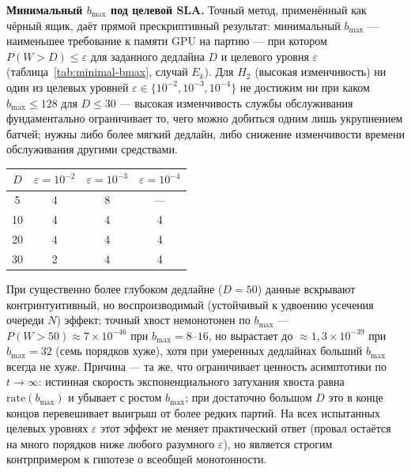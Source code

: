 \documentclass[12pt,a4paper]{article}
\begin{document}
\bigskip
\noindent\textbf{Минимальный $b_{\max}$ под целевой SLA.} Точный метод, применённый как чёрный ящик, даёт прямой прескриптивный результат: минимальный $b_{\max}$ --- наименьшее требование к памяти GPU на партию --- при котором $P(W>D)\le\varepsilon$ для заданного дедлайна $D$ и целевого уровня $\varepsilon$ (таблица~\ref{tab:minimal-bmax}, случай $E_k$). Для $H_2$ (высокая изменчивость) ни один из целевых уровней $\varepsilon\in\{10^{-2},10^{-3},10^{-4}\}$ не достижим ни при каком $b_{\max}\le128$ для $D\le30$ --- высокая изменчивость службы обслуживания фундаментально ограничивает то, чего можно добиться одним лишь укрупнением батчей; нужны либо более мягкий дедлайн, либо снижение изменчивости времени обслуживания другими средствами.

\begin{center}
\label{tab:minimal-bmax}
\begin{tabular}{|c|c|c|c|}
\hline
$D$ & $\varepsilon=10^{-2}$ & $\varepsilon=10^{-3}$ & $\varepsilon=10^{-4}$ \\
\hline
5  & 4 & 8 & --- \\
10 & 4 & 4 & 4 \\
20 & 4 & 4 & 4 \\
30 & 2 & 4 & 4 \\
\hline
\end{tabular}
\end{center}

\bigskip
\noindent При существенно более глубоком дедлайне ($D=50$) данные вскрывают контринтуитивный, но воспроизводимый (устойчивый к удвоению усечения очереди $N$) эффект: точный хвост немонотонен по $b_{\max}$ --- $P(W>50)\approx7\times10^{-46}$ при $b_{\max}=8$--$16$, но вырастает до $\approx1,3\times10^{-39}$ при $b_{\max}=32$ (семь порядков хуже), хотя при умеренных дедлайнах больший $b_{\max}$ всегда не хуже. Причина --- та же, что ограничивает ценность асимптотики по $t\to\infty$: истинная скорость экспоненциального затухания хвоста равна $\mathrm{rate}(b_{\max})$ и убывает с ростом $b_{\max}$; при достаточно большом $D$ это в конце концов перевешивает выигрыш от более редких партий. На всех испытанных целевых уровнях $\varepsilon$ этот эффект не меняет практический ответ (провал остаётся на много порядков ниже любого разумного $\varepsilon$), но является строгим контрпримером к гипотезе о всеобщей монотонности.
\end{document}
